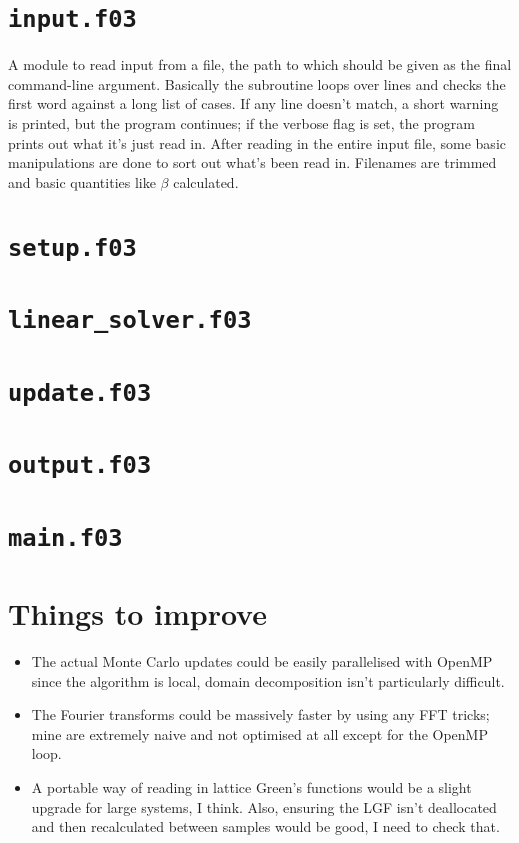 \documentclass{article}
\begin{document}
\section*{\texttt{input.f03}}

A module to read input from a file, the path to which should be given as the final command-line argument.
Basically the subroutine loops over lines and checks the first word against a long list of cases.
If any line doesn't match, a short warning is printed, but the program continues; if the verbose flag is set, the program prints out what it's just read in.
After reading in the entire input file, some basic manipulations are done to sort out what's been read in.
Filenames are trimmed and basic quantities like $\beta$ calculated.

\section*{\texttt{setup.f03}}

\section*{\texttt{linear{\_}solver.f03}}

\section*{\texttt{update.f03}}

\section*{\texttt{output.f03}}

\section*{\texttt{main.f03}}

\section*{Things to improve}

\begin{itemize}
  \item The actual Monte Carlo updates could be easily parallelised with OpenMP \textendash{} since the algorithm is local, domain decomposition isn't particularly difficult.
  \item The Fourier transforms could be massively faster by using any FFT tricks; mine are extremely naive and not optimised at all except for the OpenMP loop.
  \item A portable way of reading in lattice Green's functions would be a slight upgrade for large systems, I think. Also, ensuring the LGF isn't deallocated and then recalculated between samples would be good, I need to check that.
\end{itemize}
\end{document}
